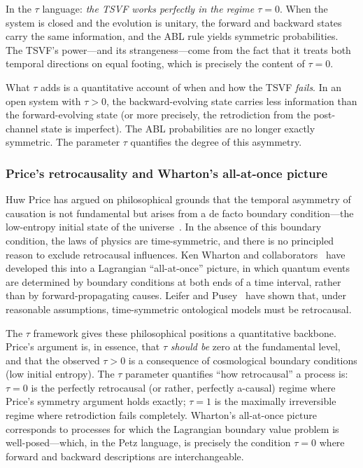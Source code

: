 \documentclass[12pt]{article}
\theoremstyle{definition}
\theoremstyle{remark}
\newcommand{\tauasym}{\tau}
\begin{document}
In the $\tauasym$ language: \emph{the TSVF works perfectly in
the regime $\tauasym = 0$}.  When the system is closed and the
evolution is unitary, the forward and backward states carry
the same information, and the ABL rule yields symmetric
probabilities.  The TSVF's power---and its strangeness---come
from the fact that it treats both temporal directions on equal
footing, which is precisely the content of $\tauasym = 0$.

What $\tauasym$ adds is a quantitative account of when and how
the TSVF \emph{fails}.  In an open system with $\tauasym > 0$,
the backward-evolving state carries less information than the
forward-evolving state (or more precisely, the retrodiction from
the post-channel state is imperfect).  The ABL probabilities are
no longer exactly symmetric.  The parameter $\tauasym$ quantifies
the degree of this asymmetry.

\subsubsection{Price's retrocausality and Wharton's all-at-once picture}

Huw Price has argued on philosophical grounds that the temporal
asymmetry of causation is not fundamental but arises from a
de facto boundary condition---the low-entropy initial state of the
universe~\cite{Price1996}.  In the absence of this boundary
condition, the laws of physics are time-symmetric, and there is no
principled reason to exclude retrocausal influences.
Ken Wharton and collaborators~\cite{Wharton2020} have developed
this into a Lagrangian ``all-at-once'' picture, in which quantum
events are determined by boundary conditions at both ends of a
time interval, rather than by forward-propagating causes.
Leifer and Pusey~\cite{Leifer2017} have shown that, under
reasonable assumptions, time-symmetric ontological models must be
retrocausal.

The $\tauasym$ framework gives these philosophical positions a
quantitative backbone.  Price's argument is, in essence, that
$\tauasym$ \emph{should be} zero at the fundamental level, and
that the observed $\tauasym > 0$ is a consequence of cosmological
boundary conditions (low initial entropy).  The $\tauasym$ parameter
quantifies ``how retrocausal'' a process is: $\tauasym = 0$ is the
perfectly retrocausal (or rather, perfectly a-causal) regime where
Price's symmetry argument holds exactly; $\tauasym = 1$ is the
maximally irreversible regime where retrodiction fails completely.
Wharton's all-at-once picture corresponds to processes for which
the Lagrangian boundary value problem is well-posed---which, in
the Petz language, is precisely the condition $\tauasym = 0$ where
forward and backward descriptions are interchangeable.
\end{document}
